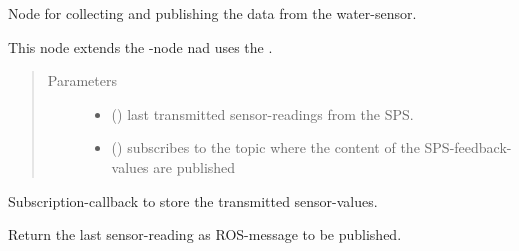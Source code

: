 \documentclass[a4paper,12pt,english]{article}
\begin{document}
\begin{fulllineitems}
\label{\detokenize{meso_control_pkg:meso_control_pkg.water_sensor_node.WaterSensor}}
Node for collecting and publishing the data from the water-sensor.

This node extends the -node nad uses the .
\begin{quote}\begin{description}
\item[{Parameters}] \leavevmode\begin{itemize}
\item {} 
 (\sphinxstyleliteralemphasis{\sphinxupquote{{[}}}\sphinxstyleliteralemphasis{\sphinxupquote{{]}}}) \textendash{} last transmitted sensor-readings from the SPS.

\item {} 
 () \textendash{} subscribes to the topic where the content of the SPS-feedback-values
are published

\end{itemize}

\end{description}\end{quote}

\begin{fulllineitems}
\label{\detokenize{meso_control_pkg:meso_control_pkg.water_sensor_node.WaterSensor.modbus_handle}}
Subscription-callback to store the transmitted sensor-values.

\end{fulllineitems}


\begin{fulllineitems}
\label{\detokenize{meso_control_pkg:meso_control_pkg.water_sensor_node.WaterSensor.read_sensor}}
Return the last sensor-reading as ROS-message to be published.

\end{fulllineitems}


\end{fulllineitems}
\end{document}
